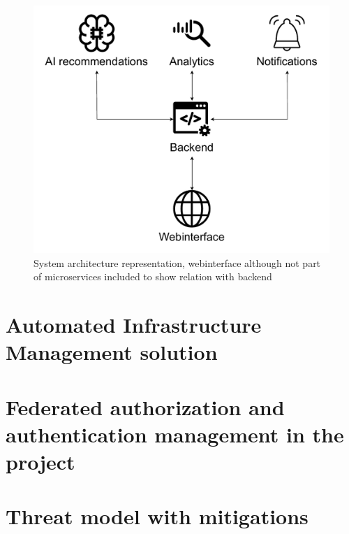 \documentclass{article}[11pt]
\begin{document}
\begin{figure}[H]
    \caption{System architecture representation, webinterface although not part of microservices included to show relation with backend}
    \centering
\includegraphics[width=\textwidth]{images/systemArchitecture.drawio.pdf}
\end{figure}


\section{Automated Infrastructure Management solution}
\section{Federated authorization and authentication management in the project}
\section{Threat model with mitigations}
\end{document}

